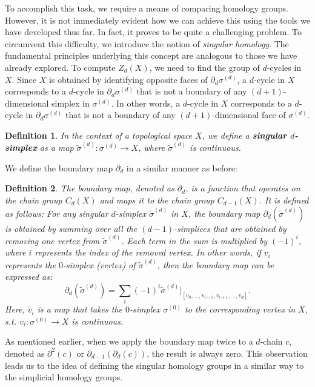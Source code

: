 \documentclass{amsart}
\newtheorem{definition}{Definition}[section]
\begin{document}
To accomplish this task, we require a means of comparing homology groups. However, it is not immediately evident how we can achieve this using the tools we have developed thus far. In fact, it proves to be quite a challenging problem. To circumvent this difficulty, we introduce the notion of \emph{singular homology}. The fundamental principles underlying this concept are analogous to those we have already explored.
To compute $Z_d(X)$, we need to find the group of $d$-cycles in $X$. Since $X$ is obtained by identifying opposite faces of $\partial_d \sigma^{(d)}$, a $d$-cycle in $X$ corresponds to a $d$-cycle in $\partial_d \sigma^{(d)}$ that is not a boundary of any $(d+1)$-dimensional simplex in $\sigma^{(d)}$. In other words, a $d$-cycle in $X$ corresponds to a $d$-cycle in $\partial_d \sigma^{(d)}$ that is not a boundary of any $(d+1)$-dimensional face of $\sigma^{(d)}$.
\begin{definition}
In the context of a topological space $X$, we define a \textbf{singular $d$-simplex} as a map $\tilde{\sigma}^{(d)}: \sigma^{(d)} \rightarrow X$, where $\tilde{\sigma}^{(d)}$ is continuous.
\end{definition}

We define the boundary map $\partial_d$ in a similar manner as before:

\begin{definition}
The boundary map, denoted as $\partial_d$, is a function that operates on the chain group $C_d(X)$ and maps it to the chain group $C_{d-1}(X)$. It is defined as follows: For any singular $d$-simplex $\tilde{\sigma}^{(d)}$ in $X$, the boundary map $\partial_d(\tilde{\sigma}^{(d)})$ is obtained by summing over all the $(d-1)$-simplices that are obtained by removing one vertex from $\tilde{\sigma}^{(d)}$. Each term in the sum is multiplied by $(-1)^i$, where $i$ represents the index of the removed vertex. In other words, if $v_i$ represents the $0$-simplex (vertex) of $\tilde{\sigma}^{(d)}$, then the boundary map can be expressed as:
\begin{equation}
\partial_d(\tilde{\sigma}^{(d)}) = \sum_{i} (-1)^i \tilde{\sigma}^{(d)}\vert_{[v_0,\ldots,v_{i-1},v_{i+1},\ldots,v_d]}.
\end{equation}
Here, $v_i$ is a map that takes the $0$-simplex $\sigma^{(0)}$ to the corresponding vertex in $X$, s.t. $v_i: \sigma^{(0)} \rightarrow X$ is continuous.
\end{definition}

As mentioned earlier, when we apply the boundary map twice to a $d$-chain $c$, denoted as $\partial^2(c)$ or $\partial_{d-1}(\partial_d(c))$, the result is always zero. This observation leads us to the idea of defining the singular homology groups in a similar way to the simplicial homology groups.
\end{document}
